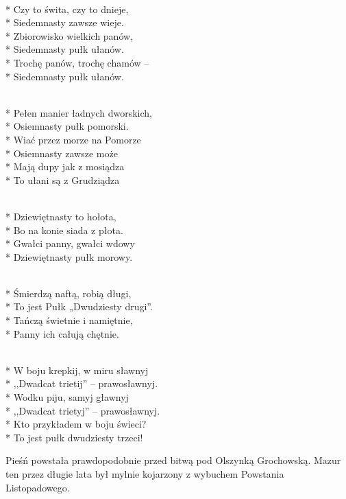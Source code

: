 \begin{lyrics}[longestline={\intertitle{1. Pułk Szwoleżerów J. Piłsudskiego}}]
\\*
\smallskip
Czy to świta, czy to dnieje,\\*
Siedemnasty zawsze wieje.\\*
\medskip
Zbiorowisko wielkich panów,\\*
Siedemnasty pułk ułanów.\\*
\medskip
Trochę panów, trochę chamów –\\*
Siedemnasty pułk ułanów.

\\*
\smallskip
Pełen manier ładnych dworskich,\\*
Osiemnasty pułk pomorski.\\*
\medskip
Wiać przez morze na Pomorze\\*
Osiemnasty zawsze może\\*
\medskip
Mają dupy jak z mosiądza\\*
To ułani są z Grudziądza

\\*
\smallskip
Dziewiętnasty to hołota,\\*
Bo na konie siada z płota.\\*
\medskip
Gwałci panny, gwałci wdowy\\*
Dziewiętnasty pułk morowy.

\\*
\smallskip
Śmierdzą naftą, robią długi,\\*
To jest Pułk „Dwudziesty drugi”.\\*
\medskip
Tańczą świetnie i namiętnie,\\*
Panny ich całują chętnie.

\\*
\smallskip
W boju krepkij, w miru sławnyj\\*
,,Dwadcat trietij'' – prawosławnyj.\\*
\medskip
Wodku piju, samyj gławnyj\\*
,,Dwadcat trietyj'' – prawosławnyj.\\*
\medskip
Kto przykładem w boju świeci?\\*
To jest pułk dwudziesty trzeci!
\end{lyrics}

\begin{info}Pieśń powstała prawdopodobnie przed bitwą pod Olszynką Grochowską. Mazur ten przez długie lata był mylnie kojarzony z wybuchem Powstania Listopadowego.\end{info}

